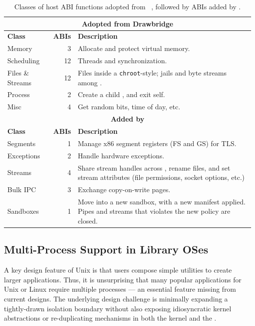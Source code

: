 \begin{table}[t]
\footnotesize
\centering
\begin{tabular}{|l|r|p{4.8in}|}
\hline
\multicolumn{3}{|c|}{\bf Adopted from Drawbridge} \\
\hline
{\bf Class} & {\bf ABIs} & {\bf Description} \\
\hline
Memory & 3 & Allocate and protect virtual memory. \\
\hline
Scheduling & 12 & Threads and synchronization. \\
\hline
Files \&  Streams & 12 & Files inside a {\tt chroot}-style; jails and byte streams among \picoprocs{}. \\
\hline
Process & 2 & Create a child \picoproc{}, and exit self. \\
\hline
Misc & 4 & Get random bits, time of day, etc. \\ %
\hline
\multicolumn{3}{|c|}{\bf Added by \sysname{}} \\
\hline
{\bf Class} & {\bf ABIs} & {\bf Description} \\
\hline
Segments & 1 & Manage x86 segment registers (FS and GS) for TLS. \\
\hline
Exceptions & 2 & Handle hardware exceptions. \\
\hline
Streams & 4 & Share stream handles across \picoprocs{}, rename files, and set stream attributes (file permissions, socket options, etc.) \\
\hline
Bulk IPC & 3 & Exchange copy-on-write pages.\\
\hline
Sandboxes & 1 & Move into a new sandbox, with a new manifest applied. Pipes and streams that violates the new policy are closed.\\
\hline
\end{tabular}
\caption[List of host ABI functions defined in \sysname{}]
{Classes of  host ABI functions adopted from \drawbridge{}~\citep{porter11drawbridge}, 
followed by ABIs added by \sysname{}. }
\label{tab:graphene:abi}
\end{table}



\subsection{Multi-Process Support in Library OSes}

A key design feature of Unix is that users compose simple utilities to create
larger applications.  Thus, it is unsurprising that many popular applications for Unix or Linux
require multiple processes
--- an essential feature missing from current \libos{} designs.
The underlying design challenge is minimally expanding 
a tightly-drawn isolation boundary
without also exposing idiosyncratic kernel abstractions or
re-duplicating mechanisms  in both the kernel and the \libos{}.

